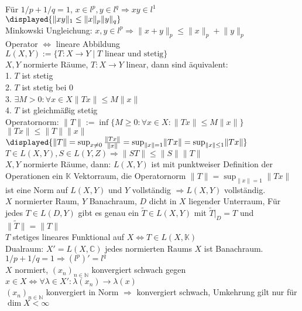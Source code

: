 \documentclass[8pt, landscape,a4paper]{extarticle}
\newcommand*\norm[1]{\lVert#1\rVert}
\begin{document}
\begin{multicols*}{3}
Für $1/p + 1/q = 1$, $x ∈ l^p, y ∈ l^q ⇒ x y ∈ l^1$ \\
$\displayed{\norm{x y}_1 \leq \norm{x}_p \norm{y}_q}$ \\
Minkowski Ungleichung: $x, y ∈ l^p ⇒ \norm{x + y}_p \leq \norm{x}_p + \norm{y}_p$ \\
Operator $⇔$ lineare Abbildung \\
$L(X, Y) := \{T: X \to Y \mid T\text{ linear und stetig}\}$ \\
$X, Y$ normierte Räume, $T: X \to Y$ linear, dann sind äquivalent: \\
1.  $T$ ist stetig \\
2.  $T$ ist stetig bei $0$ \\
3.  $∃ M > 0: ∀ x ∈ X \norm{T x} \leq M \norm{x}$ \\
4.  $T$ ist gleichmäßig stetig \\
Operatornorm: $\norm{T} := \inf\{M \geq 0: ∀ x ∈ X: \norm{T x} \leq M \norm{x}\}$ \\
$\norm{T x} \leq \norm{T} \norm{x}$ \\
$\displayed{\norm{T} = \sup_{x \neq 0} \frac{\norm{T x}}{\norm{x}} = \sup_{\norm{x} = 1} \norm{T x} = \sup_{\norm{x} \leq 1} \norm{T x}}$ \\
$T ∈ L(X, Y), S ∈ L(Y, Z) ⇒ \norm{ST} \leq \norm{S} \norm{T}$ \\
$X, Y$ normierte Räume, dann: $L(X, Y)$ ist mit punktweiser Definition der Operationen ein $\mathbb{K}$ Vektorraum,
die Operatornorm $\norm{T} = \sup_{\norm{x} = 1} \norm{T x}$ ist eine Norm auf $L(X, Y)$ und $Y$ vollständig $⇒ L(X, Y)$ vollständig. \\
$X$ normierter Raum, $Y$ Banachraum, $D$ dicht in $X$ liegender Unterraum, Für jedes $T ∈ L(D, Y)$ gibt es genau ein
$\tilde T ∈ L(X, Y)$ mit $\tilde T\Big|_D = T$ und $\norm{\tilde T} = \norm{T}$ \\
$T$ stetiges lineares Funktional auf $X ⇔ T ∈ L(X, \mathbb{K})$ \\
Dualraum: $X' = L(X, ℂ)$ jedes normierten Raums $X$ ist Banachraum. \\
$1/p + 1/q = 1 ⇒ (l^p)' = l^q$ \\
$X$ normiert, $(x_n)_{n ∈ ℕ}$ konvergiert schwach gegen $x ∈ X ⇔ ∀ λ ∈ X': λ(x_n) \to λ(x)$ \\
$(x_n)_{n ∈ ℕ}$ konvergiert in Norm $⇒$ konvergiert schwach, Umkehrung gilt nur für $\dim X < ∞$ \\

\end{multicols*}
\end{document}
